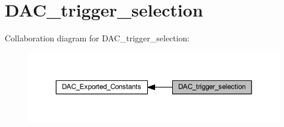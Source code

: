 \hypertarget{group___d_a_c__trigger__selection}{}\section{D\+A\+C\+\_\+trigger\+\_\+selection}
\label{group___d_a_c__trigger__selection}
Collaboration diagram for D\+A\+C\+\_\+trigger\+\_\+selection\+:
\nopagebreak
\begin{figure}[H]
\begin{center}
\leavevmode
\includegraphics[width=350pt]{group___d_a_c__trigger__selection}
\end{center}
\end{figure}
